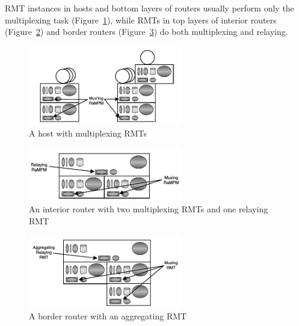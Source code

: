             RMT instances in hosts and bottom layers of routers usually perform only the multiplexing task (Figure~\ref{fig:rina:rmt:mux}), while RMTs in top layers of interior routers (Figure~\ref{fig:rina:rmt:relay}) and border routers (Figure~\ref{fig:rina:rmt:agg}) do both multiplexing and relaying.

            \begin{figure}[H]
                \begin{center}
                    \includegraphics[width=0.6\textwidth]{fig/fwding_rmt-mux.png}
                  \caption{A host with multiplexing RMTs}
                  \label{fig:rina:rmt:mux}
                \end{center}
            \end{figure}
            \begin{figure}[H]
                \begin{center}
                    \includegraphics[width=0.6\textwidth]{fig/fwding_rmt-relay.png}
                  \caption{An interior router with two multiplexing RMTs and one relaying RMT}
                  \label{fig:rina:rmt:relay}
                \end{center}
            \end{figure}
            \begin{figure}[H]
                \begin{center}
                    \includegraphics[width=0.6\textwidth]{fig/fwding_rmt-agg.png}
                  \caption{A border router with an aggregating RMT}
                  \label{fig:rina:rmt:agg}
                \end{center}
            \end{figure}


